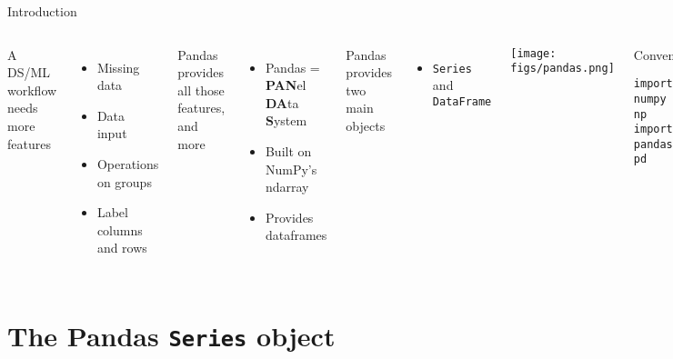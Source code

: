 \documentclass[10pt,compress]{beamer} %
\begin{document}
\begin{frame}[fragile]{Introduction}
	\begin{columns}
		A DS/ML workflow needs more features
		\begin{itemize}
			\item Missing data
			\item Data input
			\item Operations on groups
			\item Label columns and rows
		\end{itemize}
		Pandas provides all those features, and more
		\begin{itemize}
			\item Pandas = \textbf{PAN}el \textbf{DA}ta \textbf{S}ystem
			\item Built on NumPy's ndarray
			\item Provides \alert{dataframes}
		\end{itemize}
		Pandas provides two main objects
		\begin{itemize}
			\item \texttt{Series} and \texttt{DataFrame}
		\end{itemize}

		\texttt{[image: figs/pandas.png]}	

		\begin{block}{\footnotesize{Convention}}
		\vspace{-0.2cm} 
\begin{lstlisting}
import numpy as np
import pandas as pd
\end{lstlisting}
		\vspace{-0.2cm} 
		\end{block}

	\end{columns}
\end{frame}

\section{The Pandas \texttt{Series} object}
\end{document}
